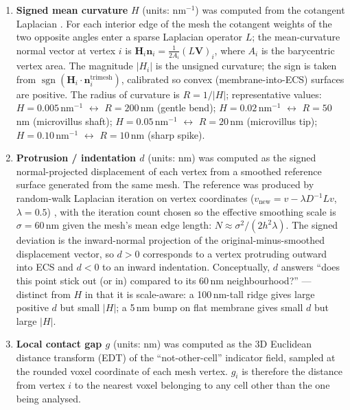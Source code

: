 \begin{enumerate}[nosep, leftmargin=*]
\item \textbf{Signed mean curvature} $H$ (units: nm$^{-1}$) was computed
from the cotangent Laplacian \cite{Pinkall1993, Meyer2003}. For each
interior edge of the mesh the cotangent weights of the two opposite
angles enter a sparse Laplacian operator $L$; the mean-curvature normal vector at vertex $i$ is
$\mathbf{H}_i \mathbf{n}_i = \frac{1}{2A_i}(L\mathbf{V})_i$, where $A_i$
is the barycentric vertex area. The magnitude $|H_i|$ is the unsigned
curvature; the sign is taken from $\operatorname{sgn}(\mathbf{H}_i \cdot \mathbf{n}_i^{\text{trimesh}})$,
calibrated so convex (membrane-into-ECS) surfaces are positive. The
radius of curvature is $R = 1/|H|$; representative values:
$H = 0.005$\,nm$^{-1}$ $\leftrightarrow$ $R = 200$\,nm (gentle bend);
$H = 0.02$\,nm$^{-1}$ $\leftrightarrow$ $R = 50$\,nm (microvillus shaft);
$H = 0.05$\,nm$^{-1}$ $\leftrightarrow$ $R = 20$\,nm (microvillus tip);
$H = 0.10$\,nm$^{-1}$ $\leftrightarrow$ $R = 10$\,nm (sharp spike).

\item \textbf{Protrusion / indentation $d$} (units: nm) was computed as
the signed normal-projected displacement of each vertex from a smoothed
reference surface generated from the same mesh. The reference was
produced by random-walk Laplacian iteration on vertex coordinates
($v_\text{new} = v - \lambda D^{-1} L v$, $\lambda = 0.5$)
\cite{Desbrun1999}, with the iteration count chosen so the effective
smoothing scale is $\sigma = 60$\,nm given the mesh's mean edge length:
$N \approx \sigma^2 / (2 h^2 \lambda)$. The signed deviation is the inward-normal
projection of the original-minus-smoothed displacement vector, so $d > 0$
corresponds to a vertex protruding outward into ECS and $d < 0$ to an
inward indentation. Conceptually, $d$ answers ``does this point stick
out (or in) compared to its 60\,nm neighbourhood?'' --- distinct from
$H$ in that it is scale-aware: a 100\,nm-tall ridge gives large positive
$d$ but small $|H|$; a 5\,nm bump on flat membrane gives small $d$ but
large $|H|$.

\item \textbf{Local contact gap $g$} (units: nm) was computed as the
3D Euclidean distance transform (EDT) \cite{Maurer2003,Virtanen2020}
of the ``not-other-cell'' indicator field, sampled at the rounded
voxel coordinate of each mesh vertex.
$g_i$ is therefore the distance from vertex $i$ to the nearest voxel
belonging to any cell other than the one being analysed.
\end{enumerate}

